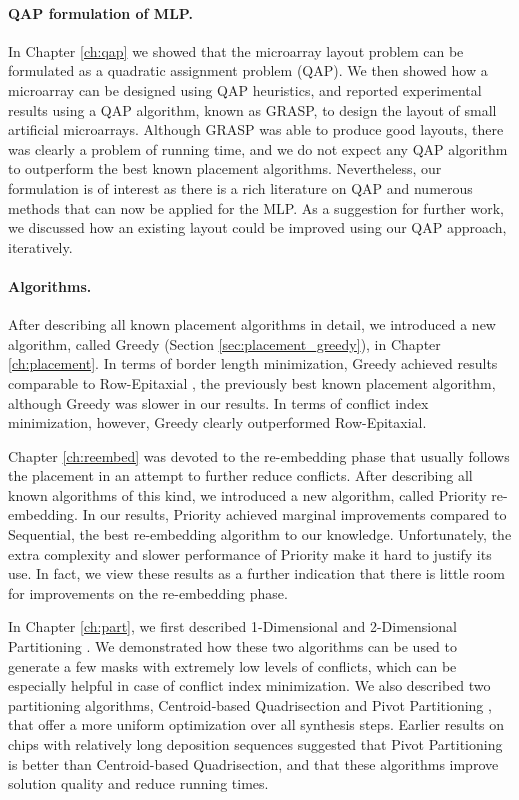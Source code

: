 \paragraph{QAP formulation of MLP.} In Chapter \ref{ch:qap} we showed that the
microarray layout problem can be formulated as a quadratic assignment problem
(QAP). We then showed how a microarray can be designed using QAP heuristics, and
reported experimental results using a QAP algorithm, known as GRASP, to design
the layout of small artificial microarrays. Although GRASP was able to produce
good layouts, there was clearly a problem of running time, and we do not expect
any QAP algorithm to outperform the best known placement algorithms.
Nevertheless, our formulation is of interest as there is a rich literature on
QAP and numerous methods that can now be applied for the MLP. As a suggestion
for further work, we discussed how an existing layout could be improved using
our QAP approach, iteratively.

\paragraph{Algorithms.} After describing all known placement algorithms in
detail, we introduced a new algorithm, called Greedy (Section
\ref{sec:placement_greedy}), in Chapter \ref{ch:placement}. In terms of border
length minimization, Greedy achieved results comparable to Row-Epitaxial
\citep{Kahng2003}, the previously best known placement algorithm, although
Greedy was slower in our results. In terms of conflict index minimization,
however, Greedy clearly outperformed Row-Epitaxial.

Chapter \ref{ch:reembed} was devoted to the re-embedding phase that usually
follows the placement in an attempt to further reduce conflicts. After
describing all known algorithms of this kind, we introduced a new algorithm,
called Priority re-embedding. In our results, Priority achieved marginal
improvements compared to Sequential, the best re-embedding algorithm to our
knowledge. Unfortunately, the extra complexity and slower performance of
Priority make it hard to justify its use. In fact, we view these results as a
further indication that there is little room for improvements on the
re-embedding phase.

In Chapter \ref{ch:part}, we first described 1-Dimensional and 2-Dimensional
Partitioning \citep{Carvalho2007}. We demonstrated how these two algorithms can
be used to generate a few masks with extremely low levels of conflicts, which
can be especially helpful in case of conflict index minimization. We also
described two partitioning algorithms, Centroid-based Quadrisection
\citep{Kahng2003a} and Pivot Partitioning \citep{Carvalho2006}, that offer a
more uniform optimization over all synthesis steps. Earlier results on chips
with relatively long deposition sequences suggested that Pivot Partitioning is
better than Centroid-based Quadrisection, and that these algorithms improve
solution quality and reduce running times.

